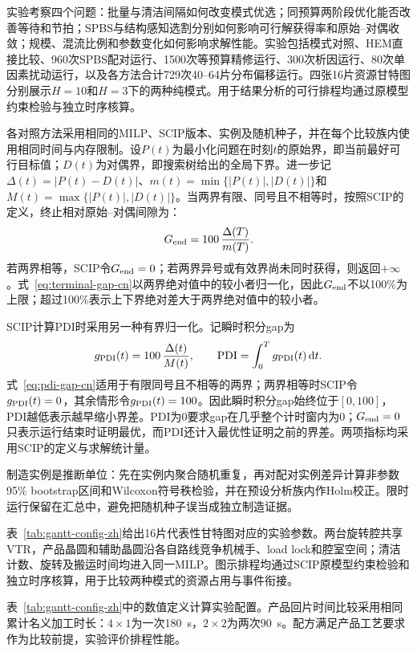 \documentclass[journal]{IEEEtran}
\newcommand{\pdi}{\mathrm{PDI}}
\begin{document}
实验考察四个问题：批量与清洁间隔如何改变模式优选；同预算两阶段优化能否改善等待和节拍；SPBS与结构感知选割分别如何影响可行解获得率和原始--对偶收敛；规模、混流比例和参数变化如何影响求解性能。实验包括模式对照、HEM直接比较、960次SPBS配对运行、1500次等预算精修运行、300次析因运行、80次单因素扰动运行，以及各方法合计729次40--64片分布偏移运行。四张16片资源甘特图分别展示$H=10$和$H=3$下的两种纯模式。用于结果分析的可行排程均通过原模型约束检验与独立时序核算。

各对照方法采用相同的MILP、SCIP版本、实例及随机种子，并在每个比较族内使用相同时间与内存限制。设$P(t)$为最小化问题在时刻$t$的原始界，即当前最好可行目标值；$D(t)$为对偶界，即搜索树给出的全局下界。进一步记$\Delta(t)=|P(t)-D(t)|$、$m(t)=\min\{|P(t)|,|D(t)|\}$和$M(t)=\max\{|P(t)|,|D(t)|\}$。当两界有限、同号且不相等时，按照SCIP的定义，终止相对原始--对偶间隙为：
\begin{equation}
G_{\rm end}=100\,\frac{\Delta(T)}{m(T)}.
\label{eq:terminal-gap-cn}
\end{equation}
若两界相等，SCIP令$G_{\rm end}=0$；若两界异号或有效界尚未同时获得，则返回$+\infty$。式~\eqref{eq:terminal-gap-cn}以两界绝对值中的较小者归一化，因此$G_{\rm end}$不以100\%为上限；超过100\%表示上下界绝对差大于两界绝对值中的较小者。

SCIP计算PDI时采用另一种有界归一化。记瞬时积分gap为
\begin{equation}
g_{\rm PDI}(t)=100\,\frac{\Delta(t)}{M(t)},\qquad
\pdi=\int_0^T g_{\rm PDI}(t)\,\mathrm dt.
\label{eq:pdi-gap-cn}
\end{equation}
式~\eqref{eq:pdi-gap-cn}适用于有限同号且不相等的两界；两界相等时SCIP令$g_{\rm PDI}(t)=0$，其余情形令$g_{\rm PDI}(t)=100$。因此瞬时积分gap始终位于$[0,100]$，PDI越低表示越早缩小界差。PDI为0要求gap在几乎整个计时窗内为0；$G_{\rm end}=0$只表示运行结束时证明最优，而PDI还计入最优性证明之前的界差。两项指标均采用SCIP的定义与求解统计量\cite{achterberg2009scip,bestuzheva2023scip}。

制造实例是推断单位：先在实例内聚合随机重复，再对配对实例差异计算非参数95\% bootstrap区间和Wilcoxon符号秩检验，并在预设分析族内作Holm校正。限时运行保留在汇总中，避免把随机种子误当成独立制造证据。

表~\ref{tab:gantt-config-zh}给出16片代表性甘特图对应的实验参数。两台旋转腔共享VTR，产品晶圆和辅助晶圆沿各自路线竞争机械手、load lock和腔室空间；清洁计数、旋转及搬运时间均进入同一MILP。图示排程均通过SCIP原模型约束检验和独立时序核算，用于比较两种模式的资源占用与事件衔接。

表~\ref{tab:gantt-config-zh}中的数值定义计算实验配置。产品回片时间比较采用相同累计名义加工时长：$4\times1$为一次180~s，$2\times2$为两次90~s。配方满足产品工艺要求作为比较前提，实验评价排程性能。
\end{document}
